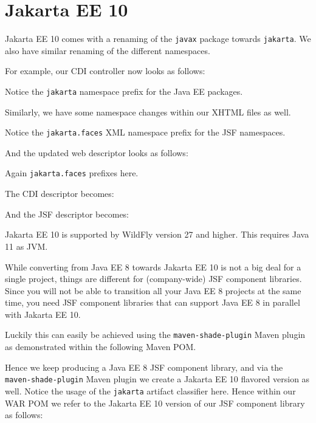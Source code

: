 %

\chapter{Jakarta EE 10}

Jakarta EE 10 comes with a renaming of the \texttt{javax} package towards \texttt{jakarta}.
We also have similar renaming of the different namespaces.

For example, our CDI controller now looks as follows:

Notice the \texttt{jakarta} namespace prefix for the Java EE packages.

Similarly, we have some namespace changes within our XHTML files as well.

Notice the \texttt{jakarta.faces} XML namespace prefix for the JSF namespaces.

And the updated web descriptor looks as follows:

Again \texttt{jakarta.faces} prefixes here.

The CDI descriptor becomes:

And the JSF descriptor becomes:


Jakarta EE 10 is supported by WildFly version 27 and higher.
This requires Java 11 as JVM.

While converting from Java EE 8 towards Jakarta EE 10 is not a big deal for a single project, things are different for (company-wide) JSF component libraries.
Since you will not be able to transition all your Java EE 8 projects at the same time, you need JSF component libraries that can support Java EE 8 in parallel with Jakarta EE 10.

Luckily this can easily be achieved using the \texttt{maven-shade-plugin} Maven plugin as demonstrated within the following Maven POM.

Hence we keep producing a Java EE 8 JSF component library, and via the \texttt{maven-shade-plugin} Maven plugin we create a Jakarta EE 10 flavored version as well.
Notice the usage of the \texttt{jakarta} artifact classifier here.
Hence within our WAR POM we refer to the Jakarta EE 10 version of our JSF component library as follows:
